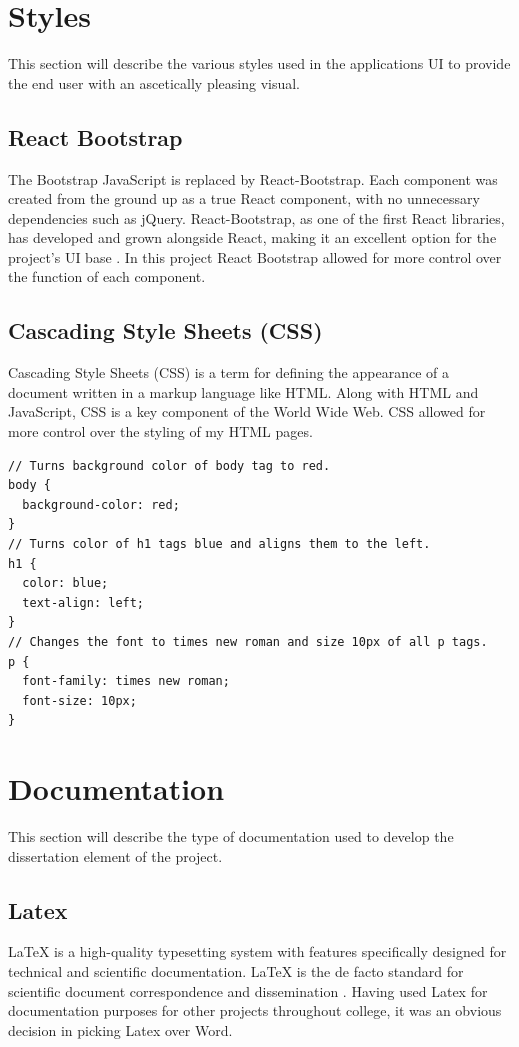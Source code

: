 \section{Styles}
This section will describe the various styles used in the applications UI to provide the end user with an ascetically pleasing visual.

\subsection{React Bootstrap}

The Bootstrap JavaScript is replaced by React-Bootstrap. Each component was created from the ground up as a true React component, with no unnecessary dependencies such as jQuery.
React-Bootstrap, as one of the first React libraries, has developed and grown alongside React, making it an excellent option for the project's UI base \cite{ReactBootstrap}. In this project React Bootstrap allowed for more control over the function of each component. 

\subsection{Cascading Style Sheets (CSS)}

Cascading Style Sheets (CSS) is a term for defining the appearance of a document written in a markup language like HTML. Along with HTML and JavaScript, CSS is a key component of the World Wide Web. CSS allowed for more control over the styling of my HTML pages.

\begin{verbatim}
// Turns background color of body tag to red.
body {
  background-color: red;
}
// Turns color of h1 tags blue and aligns them to the left.
h1 {
  color: blue;
  text-align: left;
}
// Changes the font to times new roman and size 10px of all p tags.
p {
  font-family: times new roman;
  font-size: 10px;
}
\end{verbatim}


\section{Documentation}
This section will describe the type of documentation used to develop the dissertation element of the project. 

\subsection{Latex}
LaTeX is a high-quality typesetting system with features specifically designed for technical and scientific documentation. LaTeX is the de facto standard for scientific document correspondence and dissemination \cite{Latex}. Having used Latex for documentation purposes for other projects throughout college, it was an obvious decision in picking Latex over Word. 

